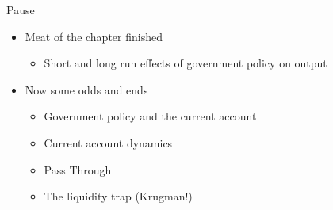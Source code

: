 \documentclass{beamer}
\begin{document}

\begin{frame}{Pause}

    \begin{itemize}
        \item Meat of the chapter finished
        \begin{itemize}
            \item Short and long run effects of government policy on output
        \end{itemize}
        \item Now some odds and ends
        \begin{itemize}
            \item Government policy and the current account 
            \item Current account dynamics
            \item Pass Through
            \item The liquidity trap (Krugman!)
        \end{itemize}
    \end{itemize}
\end{frame}
\end{document}
